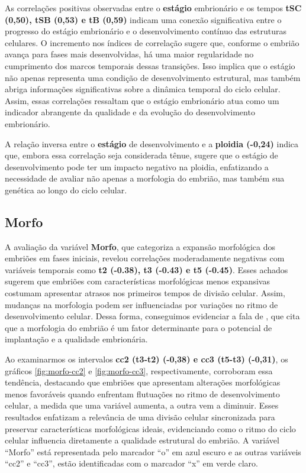 As correlações positivas observadas entre o \textbf{estágio} embrionário e os tempos \textbf{tSC (0,50), tSB (0,53) e tB (0,59)} indicam uma conexão significativa entre o progresso do estágio embrionário e o desenvolvimento contínuo das estruturas celulares. O incremento nos índices de correlação sugere que, conforme o embrião avança para fases mais desenvolvidas, há uma maior regularidade no cumprimento dos marcos temporais dessas transições. Isso implica que o estágio não apenas representa uma condição de desenvolvimento estrutural, mas também abriga informações significativas sobre a dinâmica temporal do ciclo celular. Assim, essas correlações ressaltam que o estágio embrionário atua como um indicador abrangente da qualidade e da evolução do desenvolvimento embrionário.

A relação inversa entre o \textbf{estágio} de desenvolvimento e a \textbf{ploidia (-0,24)} indica que, embora essa correlação seja considerada tênue, sugere que o estágio de desenvolvimento pode ter um impacto negativo na ploidia, enfatizando a necessidade de avaliar não apenas a morfologia do embrião, mas também sua genética ao longo do ciclo celular. 

\subsection*{Morfo}
A avaliação da variável \textbf{Morfo}, que categoriza a expansão morfológica dos embriões em fases iniciais, revelou correlações moderadamente negativas com variáveis temporais como \textbf{t2 (-0.38), t3 (-0.43) e t5 (-0.45)}. Esses achados sugerem que embriões com características morfológicas menos expansivas costumam apresentar atrasos nos primeiros tempos de divisão celular. Assim, mudanças na morfologia podem ser influenciadas por variações no ritmo de desenvolvimento celular. Dessa forma, conseguimos evidenciar a fala de , que cita que a morfologia do embrião é um fator determinante para o potencial de implantação e a qualidade embrionária. 

Ao examinarmos os intervalos \textbf{cc2 (t3-t2) (-0,38) e cc3 (t5-t3) (-0,31)}, os gráficos \ref{fig:morfo-cc2} e \ref{fig:morfo-cc3}, respectivamente, corroboram essa tendência, destacando que embriões que apresentam alterações morfológicas menos favoráveis quando enfrentam flutuações no ritmo de desenvolvimento celular, a medida que uma variável aumenta, a outra vem a diminuir. Esses resultados enfatizam a relevância de uma divisão celular sincronizada para preservar características morfológicas ideais, evidenciando como o ritmo do ciclo celular influencia diretamente a qualidade estrutural do embrião. A variável “Morfo” está representada pelo marcador “o” em azul escuro e as outras variáveis “cc2” e “cc3”, estão identificadas com o marcador “x” em verde claro.



